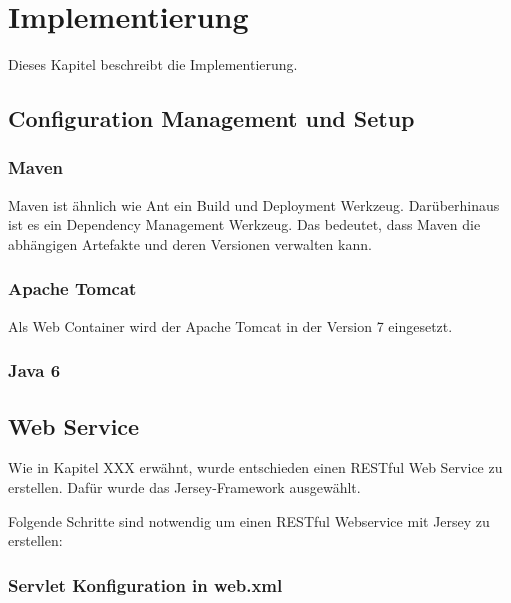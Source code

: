 \chapter{Implementierung} \label{kap:implementierung}

Dieses Kapitel beschreibt die Implementierung. 

\section{Configuration Management und Setup}

\subsection{Maven}
Maven ist ähnlich wie Ant ein Build und Deployment Werkzeug. Darüberhinaus ist es ein Dependency Management Werkzeug. Das bedeutet, dass Maven die abhängigen Artefakte und deren Versionen verwalten kann. 

\subsection{Apache Tomcat}
Als Web Container wird der \gls{Apache Tomcat} in der Version 7 eingesetzt. 

\subsection{Java 6}

\section{Web Service}\label{kap:webservice}

Wie in Kapitel XXX erwähnt, wurde entschieden einen \gls{REST}ful Web Service zu erstellen. Dafür wurde das Jersey-Framework ausgewählt.

Folgende Schritte sind notwendig um einen \gls{REST}ful Webservice mit Jersey zu erstellen: 

\subsection{Servlet Konfiguration in web.xml} 

